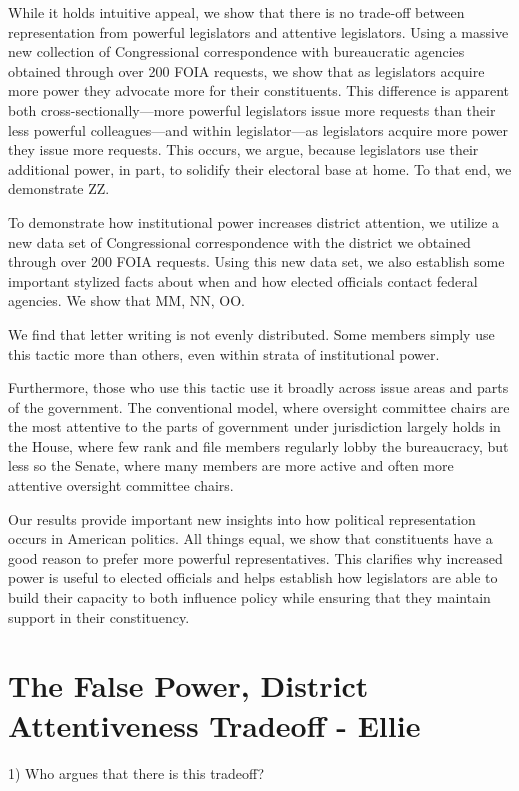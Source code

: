 \documentclass[]{article}
\begin{document}
While it holds intuitive appeal, we show that there is no trade-off between representation from powerful legislators and attentive legislators.  Using a massive new collection of Congressional correspondence with bureaucratic agencies obtained through over 200 FOIA requests, we show that as legislators acquire more power they advocate more for their constituents.  This difference is apparent both cross-sectionally---more powerful legislators issue more requests than their less powerful colleagues---and within legislator---as legislators acquire more power they issue more requests.  This occurs, we argue, because legislators use their additional power, in part, to solidify their electoral base at home. To that end, we demonstrate ZZ.

To demonstrate how institutional power increases district attention, we utilize a new data set of Congressional correspondence with the district we obtained through over 200 FOIA requests. Using this new data set, we also establish some important stylized facts about when and how elected officials contact federal agencies. We show that MM, NN, OO. 

We find that letter writing is not evenly distributed. Some members simply use this tactic more than others, even within strata of institutional power. 

Furthermore, those who use this tactic use it broadly across issue areas and parts of the government. The conventional model, where oversight committee chairs are the most attentive to the parts of government under jurisdiction largely holds in the House, where few rank and file members regularly lobby the bureaucracy, but less so the Senate, where many members are more active and often more attentive oversight committee chairs. 

Our results provide important new insights into how political representation occurs in American politics.  All things equal, we show that constituents have a good reason to prefer more powerful representatives. This clarifies why increased power is useful to elected officials and helps establish how legislators are able to build their capacity to both influence policy while ensuring that they maintain support in their constituency. 


\section{The False Power, District Attentiveness Tradeoff - Ellie}

1) Who argues that there is this tradeoff?
\end{document}
